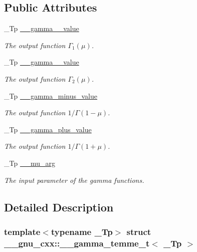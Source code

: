 \subsection*{Public Attributes}
\begin{DoxyCompactItemize}
\item 
\+\_\+\+Tp \hyperlink{struct____gnu__cxx_1_1____gamma__temme__t_a5cd3cdcf5479d232d3ea118c69198215}{\+\_\+\+\_\+gamma\+\_\+\_\+value}
\begin{DoxyCompactList}\small\item\em The output function $ \Gamma_1(\mu) $. \end{DoxyCompactList}\item 
\+\_\+\+Tp \hyperlink{struct____gnu__cxx_1_1____gamma__temme__t_af3113befce3b6bc9c561472fbaff4520}{\+\_\+\+\_\+gamma\+\_\+\_\+value}
\begin{DoxyCompactList}\small\item\em The output function $ \Gamma_2(\mu) $. \end{DoxyCompactList}\item 
\+\_\+\+Tp \hyperlink{struct____gnu__cxx_1_1____gamma__temme__t_afc5c8fbbc48bdb065bc425e53605dc3c}{\+\_\+\+\_\+gamma\+\_\+minus\+\_\+value}
\begin{DoxyCompactList}\small\item\em The output function $ 1/\Gamma(1 - \mu) $. \end{DoxyCompactList}\item 
\+\_\+\+Tp \hyperlink{struct____gnu__cxx_1_1____gamma__temme__t_a5484bd46240c8348c2d1f0718a056665}{\+\_\+\+\_\+gamma\+\_\+plus\+\_\+value}
\begin{DoxyCompactList}\small\item\em The output function $ 1/\Gamma(1 + \mu) $. \end{DoxyCompactList}\item 
\+\_\+\+Tp \hyperlink{struct____gnu__cxx_1_1____gamma__temme__t_a841e7c549dd505de260018ddaa020565}{\+\_\+\+\_\+mu\+\_\+arg}
\begin{DoxyCompactList}\small\item\em The input parameter of the gamma functions. \end{DoxyCompactList}\end{DoxyCompactItemize}


\subsection{Detailed Description}
\subsubsection*{template$<$typename \+\_\+\+Tp$>$\newline
struct \+\_\+\+\_\+gnu\+\_\+cxx\+::\+\_\+\+\_\+gamma\+\_\+temme\+\_\+t$<$ \+\_\+\+Tp $>$}

